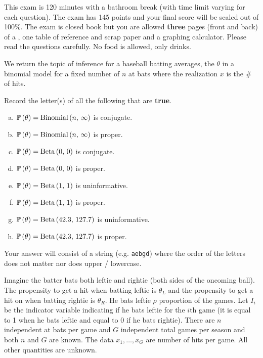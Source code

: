 \documentclass[12pt]{article}
\newcommand{\instr}{\scriptsize Your answer will consist of a string (e.g. \texttt{aebgd}) where the order of the letters does not matter nor does upper / lowercase. \normalsize}
\newcommand{\recordletters}{\small Record the letter(s) of all the following that are \textbf{true}. \normalsize}
\begin{document}
This exam is 120 minutes with a bathroom break (with time limit varying for each question). The exam has 145 points and your final score will be scaled out of 100\%. The exam is closed book but you are allowed \textbf{three} pages (front and back) of a , one table of reference and scrap paper and a graphing calculator. Please read the questions carefully. No food is allowed, only drinks. %

\pagebreak


\problem [4min] We return the topic of inference for a baseball batting averages, the $\theta$ in a binomial model for a fixed number of $n$ at bats where the realization $x$ is the \# of hits.

\benum{} \recordletters

\begin{enumerate}[(a)]
\item $\mathbb{P}\left(\theta\right) = \mathrm{Binomial}\left(n,\,\infty\right)$ is conjugate.
\item $\mathbb{P}\left(\theta\right) = \mathrm{Binomial}\left(n,\,\infty\right)$ is proper.
\item $\mathbb{P}\left(\theta\right) = \mathrm{Beta}\left(0,\,0\right)$ is conjugate.
\item $\mathbb{P}\left(\theta\right) = \mathrm{Beta}\left(0,\,0\right)$ is proper.
\item $\mathbb{P}\left(\theta\right) = \mathrm{Beta}\left(1,\,1\right)$ is uninformative.
\item $\mathbb{P}\left(\theta\right) = \mathrm{Beta}\left(1,\,1\right)$ is proper.
\item $\mathbb{P}\left(\theta\right) = \mathrm{Beta}\left(42.3,\,127.7\right)$ is uninformative.
\item $\mathbb{P}\left(\theta\right) = \mathrm{Beta}\left(42.3,\,127.7\right)$ is proper.
\end{enumerate}\eenum\instr\pagebreak


\problem [22min] Imagine the batter bats both leftie and rightie (both sides of the oncoming ball). The propensity to get a hit when batting leftie is $\theta_L$ and the propensity to get a hit on when batting rightie is $\theta_R$. He bats leftie $\rho$ proportion of the games. Let $I_i$ be the indicator variable indicating if he bats leftie for the $i$th game (it is equal to 1 when he bats leftie and equal to 0 if he bats rightie). There are $n$ independent at bats per game and $G$ independent total games per season and both $n$ and $G$ are known. The data $x_1, \ldots, x_G$ are number of hits per game. All other quantities are unknown.
\end{document}
